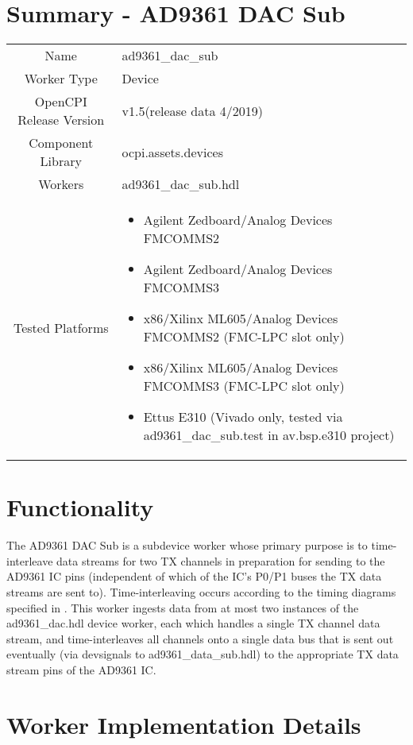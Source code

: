 \documentclass{article}
\author{} %
\date{Version \docVersion} %
\title{\docTitle}
\def\docVersion{1.5}
\def\comp{ad9361\_dac\_sub}
\def\Comp{AD9361 DAC Sub}
\begin{document}
\section*{Summary - \Comp}
\begin{tabular}{|c|M{13.5cm}|}
	\hline
	                  &                  \\
	\hline
	Name              & \comp            \\
	\hline
	Worker Type       & Device           \\
	\hline
	OpenCPI Release Version & v\docVersion (release data 4/2019) \\
	\hline
	Component Library & ocpi.assets.devices     \\
	\hline
	Workers           & \comp.hdl        \\
	\hline
	Tested Platforms  &
\begin{itemize}
  \item Agilent Zedboard/Analog Devices FMCOMMS2
  \item Agilent Zedboard/Analog Devices FMCOMMS3
  \item x86/Xilinx ML605/Analog Devices FMCOMMS2 (FMC-LPC slot only)
  \item x86/Xilinx ML605/Analog Devices FMCOMMS3 (FMC-LPC slot only)
  \item Ettus E310 (Vivado only, tested via \comp{}.test in av.bsp.e310 project)
\end{itemize} \\
	\hline
\end{tabular}

\section*{Functionality}
	The \Comp{} is a subdevice worker whose primary purpose is to time-interleave data streams for two TX channels in preparation for sending to the AD9361 IC pins (independent of which of the IC's P0/P1 buses the TX data streams are sent to). Time-interleaving occurs according to the timing diagrams specified in \cite{adi_ug570}. This worker ingests data from at most two instances of the ad9361\_dac.hdl device worker, each which handles a single TX channel data stream, and time-interleaves all channels onto a single data bus that is sent out eventually (via devsignals to ad9361\_data\_sub.hdl\cite{data_sub_comp_datasheet}) to the appropriate TX data stream pins of the AD9361 IC\cite{ad9361}.

\section*{Worker Implementation Details}
\end{document}
